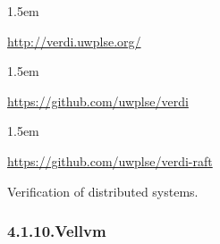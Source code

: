 \documentclass[12pt,twoside]{article}
\begin{document}
\begin{mddefinitions}%


\begin{mdbmarginx}{}{}{}{1.5em}%
\begin{mddefdata}%
\href{http://verdi.uwplse.org/}{{\ttfamily http://\hspace{0pt}verdi.\hspace{0pt}uwplse.\hspace{0pt}org/\hspace{0pt}}}
\end{mddefdata}%
\end{mdbmarginx}%


\begin{mdbmarginx}{}{}{}{1.5em}%
\begin{mddefdata}%
\href{https://github.com/uwplse/verdi}{{\ttfamily https://\hspace{0pt}github.\hspace{0pt}com/\hspace{0pt}uwplse/\hspace{0pt}verdi}}
\end{mddefdata}%
\end{mdbmarginx}%


\begin{mdbmarginx}{}{}{}{1.5em}%
\begin{mddefdata}%
\href{https://github.com/uwplse/verdi-raft}{{\ttfamily https://\hspace{0pt}github.\hspace{0pt}com/\hspace{0pt}uwplse/\hspace{0pt}verdi-\hspace{0pt}raft}}%
\end{mddefdata}%
\end{mdbmarginx}%
\end{mddefinitions}%

\noindent{}Verification of distributed systems.%

\subsubsection{4.1.10.\hspace*{0.5em}Vellvm}\label{sec-vellvm}%
\end{document}
